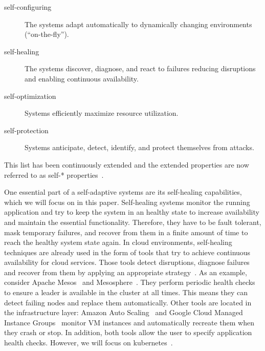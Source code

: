   \begin{description}
    \item[self-configuring] The systems adapt automatically to dynamically changing environments (\enquote{on-the-fly}).
    \item[self-healing] The systems discover, diagnose, and react to failures reducing disruptions and enabling continuous availability.
    \item[self-optimization] Systems efficiently maximize resource utilization.
    \item[self-protection] Systems anticipate, detect, identify, and protect themselves from attacks.
  \end{description}

  This list has been continuously extended and the extended properties are now referred to as self-* properties~\cite{PsaierSurvey}.

  One essential part of a self-adaptive systems are its self-healing capabilities, which we will focus on in this paper.
  Self-healing systems monitor the running application and try to keep the system in an healthy state to increase availability and maintain the essential functionality.
  Therefore, they have to be fault tolerant, mask temporary failures, and recover from them in a finite amount of time to reach the healthy system state again.
  In cloud environments, self-healing techniques are already used in the form of tools that try to achieve continuous availability for cloud services.
  Those tools detect disruptions, diagnose failures and recover from them by applying an appropriate strategy~\cite{PsaierSurvey}.
  As an example, consider Apache Mesos~\cite{mesos} and Mesosphere~\cite{mesosphere}.
  They perform periodic health checks to ensure a leader is available in the cluster at all times.
  This means they can detect failing nodes and replace them automatically.
  Other tools are located in the infrastructure layer:
  Amazon Auto Scaling~\cite{amazon-auto-scaling} and Google Cloud Managed Instance Groups~\cite{gcp-mig} monitor VM instances and automatically recreate them when they crash or stop.
  In addition, both tools allow the user to specify application health checks.
  However, we will focus on \gls{kubernetes}~\cite{kubernetes}.

